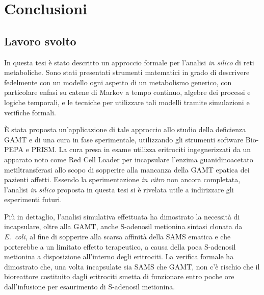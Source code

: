 \chapter{Conclusioni}\label{cap:conclusioni}
	\section{Lavoro svolto}
	In questa tesi \`e stato descritto un approccio formale per l'analisi \emph{in silico} di reti metaboliche.
	Sono stati presentati strumenti matematici in grado di descrivere fedelmente con un modello ogni aspetto di un metabolismo generico, con particolare enfasi su catene di Markov a tempo continuo, algebre dei processi e logiche temporali, e le tecniche per utilizzare tali modelli tramite simulazioni e verifiche formali.
	
	\`E stata proposta un'applicazione di tale approccio allo studio della deficienza GAMT e di una cura in fase sperimentale, utilizzando gli strumenti software Bio-PEPA e PRISM.
	La cura presa in esame utilizza eritrociti ingegnerizzati da un apparato noto come Red Cell Loader per incapsulare l'enzima guanidinoacetato metiltransferasi allo scopo di sopperire alla mancanza della GAMT epatica dei pazienti affetti.
	Essendo la sperimentazione \emph{in vitro} non ancora completata, l'analisi \emph{in silico} proposta in questa tesi si \`e rivelata utile a indirizzare gli esperimenti futuri.
	
	Pi\`u in dettaglio, l'analisi simulativa effettuata ha dimostrato la necessit\`a di incapsulare, oltre alla GAMT, anche S-adenosil metionina sintasi clonata da \emph{E.\ coli}, al fine di sopperire alla scarsa affinit\`a della SAMS ematica e che porterebbe a un limitato effetto terapeutico, a causa della poca S-adenosil metionina a disposizione all'interno degli eritrociti.
	La verifica formale ha dimostrato che, una volta incapsulate sia SAMS che GAMT, non c'\`e rischio che il bioreattore costituito dagli eritrociti smetta di funzionare entro poche ore dall'infusione per esaurimento di S-adenosil metionina.
	
